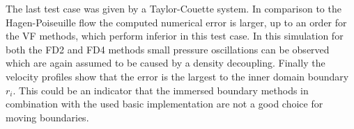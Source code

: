 The last test case was given by a Taylor-Couette system.
In comparison to the Hagen-Poiseuille flow the  computed numerical error is larger,
up to an order for the VF methods, which perform inferior in this test case.
In this simulation for both the FD2 and FD4 methods small pressure oscillations can be observed which are again assumed to be
caused by a density decoupling.
Finally the velocity profiles show that the error is the largest to the inner domain boundary $r_i$.
This could be an indicator that the immersed boundary methods in combination with the used basic implementation
are not a good choice for moving boundaries.




